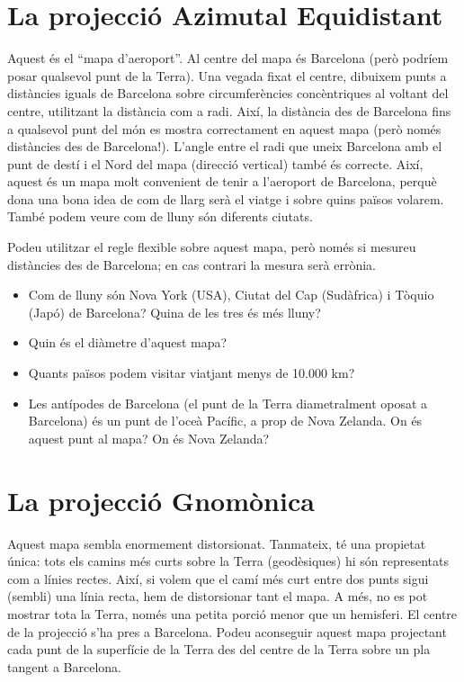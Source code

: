 \documentclass[a4paper,12pt]{article}
\begin{document}
\newpage
\section{La projecció Azimutal Equidistant}
Aquest és el ``mapa d'aeroport''. Al centre del mapa és Barcelona (però podríem posar qualsevol punt de la Terra). Una vegada fixat el centre, dibuixem punts a distàncies iguals de Barcelona sobre circumferències concèntriques al voltant del centre, utilitzant la distància com a radi. Així, la distància des de Barcelona fins a qualsevol punt del món es mostra correctament en aquest mapa (però només distàncies des de Barcelona!). L'angle entre el radi que uneix Barcelona amb el punt de destí i el Nord del mapa (direcció vertical) també és correcte. Així, aquest és un mapa molt convenient de tenir a l'aeroport de Barcelona, perquè dona una bona idea de com de llarg serà el viatge i sobre quins països volarem. També podem veure com de lluny són diferents ciutats.

Podeu utilitzar el regle flexible sobre aquest mapa, però només si mesureu distàncies des de Barcelona; en cas contrari la mesura serà errònia.

\begin{itemize}
 \item Com de lluny són Nova York (USA), Ciutat del Cap (Sudàfrica) i Tòquio (Japó) de Barcelona? Quina de les tres és més lluny?
 \item Quin és el diàmetre d'aquest mapa?
 \item Quants països podem visitar viatjant menys de 10.000 km? 
 \item Les antípodes de Barcelona (el punt de la Terra diametralment oposat a Barcelona) és un punt de l'oceà Pacífic, a prop de Nova Zelanda. On és aquest punt al mapa? On és Nova Zelanda?
\end{itemize}



\newpage
\section{La projecció Gnomònica}
Aquest mapa sembla enormement distorsionat. Tanmateix, té una propietat única: tots els camins més curts sobre la Terra (geodèsiques) hi són representats com a línies rectes. Així, si volem que el camí més curt entre dos punts sigui (sembli) una línia recta, hem de distorsionar tant el mapa. A més, no es pot mostrar tota la Terra, només una petita porció menor que un hemisferi. El centre de la projecció s'ha pres a Barcelona. Podeu aconseguir aquest mapa projectant cada punt de la superfície de la Terra des del centre de la Terra sobre un pla tangent a Barcelona.
\end{document}
